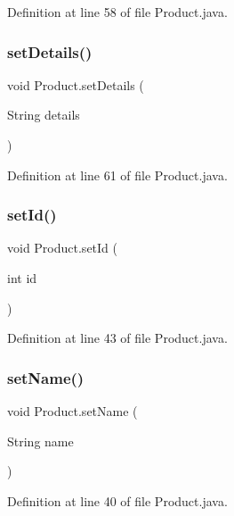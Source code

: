 Definition at line 58 of file Product.\+java.

\mbox{\label{class_product_acf9f458bbdef71e32236d6ee94748f89}} 
\subsubsection{\texorpdfstring{setDetails()}{setDetails()}}
{\footnotesize\ttfamily void Product.\+set\+Details (\begin{DoxyParamCaption}\item[{String}]{details }\end{DoxyParamCaption})}



Definition at line 61 of file Product.\+java.

\mbox{\label{class_product_a611c68129427dea75fa1f811b0dc19bc}} 
\subsubsection{\texorpdfstring{setId()}{setId()}}
{\footnotesize\ttfamily void Product.\+set\+Id (\begin{DoxyParamCaption}\item[{int}]{id }\end{DoxyParamCaption})}



Definition at line 43 of file Product.\+java.

\mbox{\label{class_product_a47566319fb32692c6c0cf2326d6a8e8d}} 
\subsubsection{\texorpdfstring{setName()}{setName()}}
{\footnotesize\ttfamily void Product.\+set\+Name (\begin{DoxyParamCaption}\item[{String}]{name }\end{DoxyParamCaption})}



Definition at line 40 of file Product.\+java.

